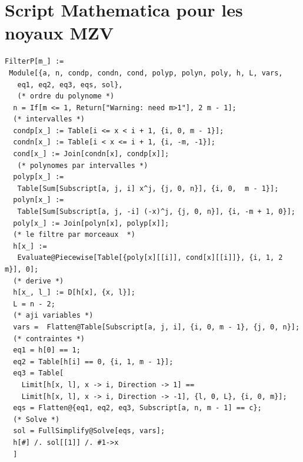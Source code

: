 \documentclass[11pt,twoside]{article}
\begin{document}
\section{Script Mathematica pour les noyaux MZV}
\label{sec:MathMZV}
\begin{lstlisting}[language=iPython]
FilterP[m_] := 
 Module[{a, n, condp, condn, cond, polyp, polyn, poly, h, L, vars, 
   eq1, eq2, eq3, eqs, sol},
   (* ordre du polynome *)
  n = If[m <= 1, Return["Warning: need m>1"], 2 m - 1];
  (* intervalles *)
  condp[x_] := Table[i <= x < i + 1, {i, 0, m - 1}];
  condn[x_] := Table[i < x <= i + 1, {i, -m, -1}];
  cond[x_] := Join[condn[x], condp[x]];
   (* polynomes par intervalles *)
  polyp[x_] := 
   Table[Sum[Subscript[a, j, i] x^j, {j, 0, n}], {i, 0,  m - 1}];
  polyn[x_] := 
   Table[Sum[Subscript[a, j, -i] (-x)^j, {j, 0, n}], {i, -m + 1, 0}];
  poly[x_] := Join[polyn[x], polyp[x]];
  (* le filtre par morceaux  *)
  h[x_] := 
   Evaluate@Piecewise[Table[{poly[x][[i]], cond[x][[i]]}, {i, 1, 2 m}], 0];
  (* derive *)
  h[x_, l_] := D[h[x], {x, l}];
  L = n - 2;
  (* aji variables *)
  vars =  Flatten@Table[Subscript[a, j, i], {i, 0, m - 1}, {j, 0, n}];
  (* contraintes *)
  eq1 = h[0] == 1;
  eq2 = Table[h[i] == 0, {i, 1, m - 1}];
  eq3 = Table[
    Limit[h[x, l], x -> i, Direction -> 1] == 
    Limit[h[x, l], x -> i, Direction -> -1], {l, 0, L}, {i, 0, m}];
  eqs = Flatten@{eq1, eq2, eq3, Subscript[a, n, m - 1] == c};
  (* Solve *)
  sol = FullSimplify@Solve[eqs, vars];
  h[#] /. sol[[1]] /. #1->x
  ]
\end{lstlisting}
\end{document}
